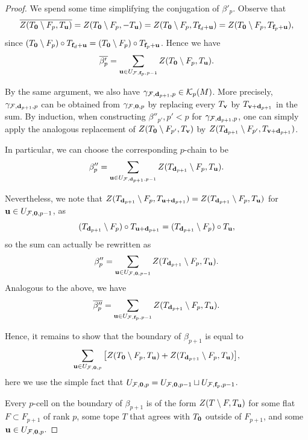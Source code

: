 \documentclass{amsart}
\newcommand\Fcal{{\mathcal F}}
\newcommand\Kcal{{\mathcal K}}
\newcommand\dd{{\bf d}}
\newcommand\ff{{\bf f}}
\newcommand\uu{{\bf u}}
\newcommand\vv{{\bf v}}
\begin{document}
{\begin{proof}
We spend some time simplifying the conjugation of $\beta'_p$. 
Observe that
$$\overline{Z(T_{\bf 0}\setminus F_p,T_{\bf u})}
=Z(T_{\bf 0}\setminus F_p,-T_{\bf u})
=Z(T_{\bf 0}\setminus F_p,T_{\ff_d + \bf u})
=Z(T_{\bf 0}\setminus F_p,T_{\ff_p+ {\bf u}}),$$ 
since $(T_{\bf 0}\setminus F_p) \circ T_{\ff_d + \bf u} = (T_{\bf 0}\setminus F_p) \circ T_{\ff_p+ {\bf u}}$.
Hence we have
 $$\overline{\beta'_p} = \sum_{{\bf u}\in U_{\Fcal,\ff_p,p-1}} Z(T_{\bf 0}\setminus F_p,T_{\bf u}).$$

By the same argument, we also have 
$\gamma_{\Fcal, \dd_{p+1},p}\in\Kcal_p(M)$.
More precisely, $\gamma_{\Fcal, \dd_{p+1},p}$ can be obtained from $\gamma_{\Fcal, {\bf 0},p}$ by replacing every $T_{\bf v}$ by $T_{{\bf v}+\dd_{p+1}}$ in the sum.
By induction, when constructing $\beta''_{p'}, p'<p$ for $\gamma_{\Fcal, \dd_{p+1},p}$, one can simply apply the analogous replacement of $Z(T_{\bf 0}\setminus F_{p'},T_\vv)$ by $Z(T_{\dd_{p+1}}\setminus F_{p'},T_{{\bf v}+\dd_{p+1}})$.

In particular, we can choose the corresponding $p$-chain to be 
$$\beta_p'' = \sum_{{\bf u}\in U_{\Fcal,\dd_{p+1}, p-1}} Z(T_{\dd_{p+1}} \setminus F_p,T_{\bf u}).$$

Nevertheless, we note that $Z(T_{\dd_{p+1}} \setminus F_p,T_{\uu+\dd_{p+1}})=Z(T_{\dd_{p+1}} \setminus F_p,T_{\bf u})$ for ${\bf u}\in U_{\Fcal,{\bf 0},p-1}$, as $$(T_{\dd_{p+1}}\setminus F_p)\circ T_{{\bf u}+\dd_{p+1}}=(T_{\dd_{p+1}}\setminus F_p)\circ T_{\bf u},$$ so the sum can actually be rewritten as
\begin{equation} \label{eq:2nd_chain}
  \beta_p'' =  \sum_{{\bf u}\in U_{\Fcal,{\bf 0}, p-1}} Z(T_{\dd_{p+1}} \setminus F_p,T_{\bf u}).
\end{equation}
Analogous to the above, 
we have $$\overline{\beta''_p} = \sum_{{\bf u}\in U_{\Fcal,\ff_p, p-1}} Z(T_{\dd_{p+1}} \setminus F_p,T_{\bf u}).$$

Hence, it remains to show that the boundary of
$\beta_{p+1}$ is equal to 
\begin{equation} \label{eq:target_chain}
    \sum_{{\bf u}\in U_{\Fcal,{\bf 0}, p}}\big[Z(T_{\bf 0}\setminus F_p,T_{\bf u})+Z(T_{\dd_{p+1}} \setminus F_p,T_{\bf u})\big],
\end{equation}
here we use the simple fact that $U_{\Fcal,{\bf 0}, p}=U_{\Fcal,{\bf 0}, p-1}\sqcup U_{\Fcal,\ff_p, p-1}$.

Every $p$-cell on the boundary of $\beta_{p+1}$ is of the form $Z(T\setminus F,T_{\bf u})$ for some flat $F\subset F_{p+1}$ of rank $p$, some tope $T$ that agrees with $T_{\bf 0}$ outside of $F_{p+1}$, and some ${\bf u}\in U_{\Fcal, {\bf 0}, p}$.


\end{proof}}
\end{document}
